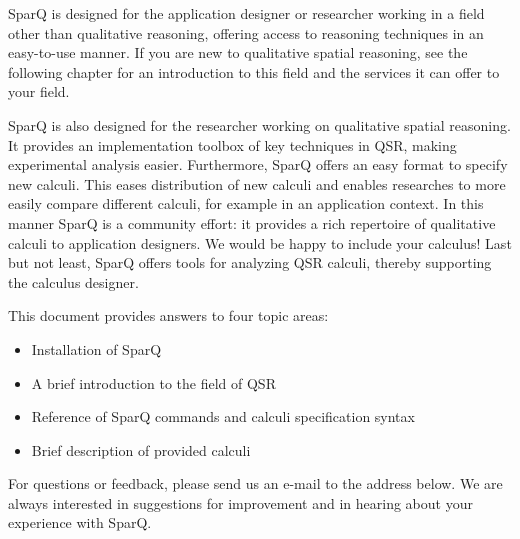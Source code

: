 \documentclass[headsepline]{scrreprt}
\theoremstyle{definition}
\newlength{\rest}
\newcommand{\engine}{SparQ}
\begin{document}
\engine{} is designed for the application designer or researcher working in a field other than qualitative reasoning, offering access to reasoning techniques in an easy-to-use manner. If you  are new to qualitative spatial reasoning, see the following chapter for an introduction to this field and the services it can offer to your field.

SparQ is also designed for the researcher working on qualitative spatial reasoning. It provides an implementation toolbox of key techniques in QSR, making experimental analysis easier. Furthermore, SparQ offers an easy format to specify new calculi. This eases distribution of new calculi and enables researches to more easily compare different calculi, for example in an application context. In this manner SparQ is a community effort: it provides a rich repertoire of qualitative calculi to application designers. We would be happy to include your calculus! Last but not least, SparQ offers tools for analyzing QSR calculi, thereby supporting the calculus designer.


This document provides answers to four topic areas:
\begin{itemize}
	\item Installation of SparQ
	\item A brief introduction to the field of QSR
	\item Reference of SparQ commands and calculi specification syntax
	\item Brief description of provided calculi 
\end{itemize}



For questions or feedback, please send us an e-mail to the address below. We are always interested in suggestions for improvement and in hearing about your experience with \engine{}.
\end{document}

